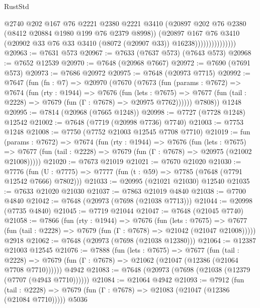 \begin{lexlean}{RustStd}
\begin{coremodule}
{\begin{coremodule}
{{{{{{{{{{{{{{{{{{{{{{{{{{{{{{{{{{{{{{{{{{{{{{{{{{{{{                              @2740
                              @202
                              @167
                              @76
                              @2221
                              @2380
                              @2221
                              @3410
                              (@20897 @202 @76 @2380 (@8412 @20884 @1980 @199 @76 @2379 @8998))
                              (@20897
                                @167
                                @76
                                @3410
                                (@20902 @33 @76 @33 @3410 (@8072 (@20907 @33)) @16238)))))))))))))))
@20963 := @7631 @573
@20967 := @7633 (@7637 @573) (@7643 @573)
@20968 := @7652 @12539
@20970 := @7648 (@20968 @7667)
@20972 := @7690 (@7691 @573)
@20973 := @7686 @20972
@20975 := @7648 (@20973 @7715)
@20992 := @7647
    (fun (fn : @7) =>
    @20970
      (@7670
        (@7673
          (fun (params : @7672) =>
          @7674
            (fun (rty : @1944) =>
            @7676
              (fun (lets : @7675) =>
              @7677 (fun (tail : @2228) => @7679 (fun (Γ : @7678) => @20975 @7762))))))
        @7808))
    @1248
@20995 := @7814 (@20968 (@7665 @1248))
@20998 := @7727 (@7728 @1248) @12542
@21002 := @7648 (@7719 (@20998 @7736) @7740)
@21003 := @7753 @1248
@21008 := @7750 (@7752 @21003 @12545 @7708 @7710)
@21019 := fun (params : @7672) =>
  @7674
    (fun (rty : @1944) =>
    @7676
      (fun (lets : @7675) =>
      @7677 (fun (tail : @2228) => @7679 (fun (Γ : @7678) => @20975 (@21002 @21008)))))
@21020 := @7673 @21019
@21021 := @7670 @21020
@21030 := @7776
    (fun (U : @7775) => @7777 (fun (t : @59) => @7785 (@7648 (@7791 @12542 @7666) @7802)))
@21033 := @20995 (@21021 @21030) @12540
@21035 := @7633 @21020 @21030
@21037 := @7863 @21019 @4840
@21038 := @7700 @4840
@21042 := @7648 (@20973 (@7698 (@21038 @7713)))
@21044 := @20998 (@7735 @4840)
@21045 := @7719 @21044
@21047 := @7648 (@21045 @7740)
@21058 := @7866
    (fun (rty : @1944) =>
    @7676
      (fun (lets : @7675) =>
      @7677 (fun (tail : @2228) => @7679 (fun (Γ : @7678) => @21042 (@21047 @21008)))))
    @2918
@21062 := @7648 (@20973 (@7698 (@21038 @12380)))
@21064 := @12387 @21003 @12545
@21076 := @7888
    (fun (lets : @7675) =>
    @7677
      (fun (tail : @2228) =>
      @7679 (fun (Γ : @7678) => @21062 (@21047 (@12386 (@21064 @7708 @7710))))))
    @4942
@21083 := @7648 (@20973 (@7698 (@21038 (@12379 (@7707 (@4943 @7710))))))
@21084 := @21064 @4942
@21093 := @7912
    (fun (tail : @2228) => @7679 (fun (Γ : @7678) => @21083 (@21047 (@12386 (@21084 @7710)))))
    @5036
}}}}}}}}}}}}}}}}}}}}}}}}}}}}}}}}}}}}}}}}}}}}}}}}}}}}}
\end{coremodule}}
\end{coremodule}
\end{lexlean}
